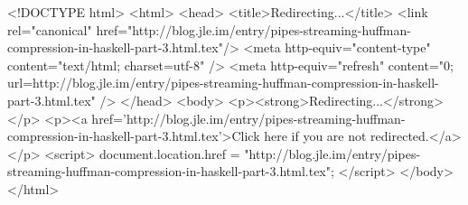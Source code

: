 <!DOCTYPE html>
<html>
<head>
<title>Redirecting...</title>
<link rel="canonical" href="http://blog.jle.im/entry/pipes-streaming-huffman-compression-in-haskell-part-3.html.tex"/>
<meta http-equiv="content-type" content="text/html; charset=utf-8" />
<meta http-equiv="refresh" content="0; url=http://blog.jle.im/entry/pipes-streaming-huffman-compression-in-haskell-part-3.html.tex" />
</head>
<body>
  <p><strong>Redirecting...</strong></p>
  <p><a href='http://blog.jle.im/entry/pipes-streaming-huffman-compression-in-haskell-part-3.html.tex'>Click here if you are not redirected.</a></p>
  <script>
    document.location.href = "http://blog.jle.im/entry/pipes-streaming-huffman-compression-in-haskell-part-3.html.tex";
  </script>
</body>
</html>
